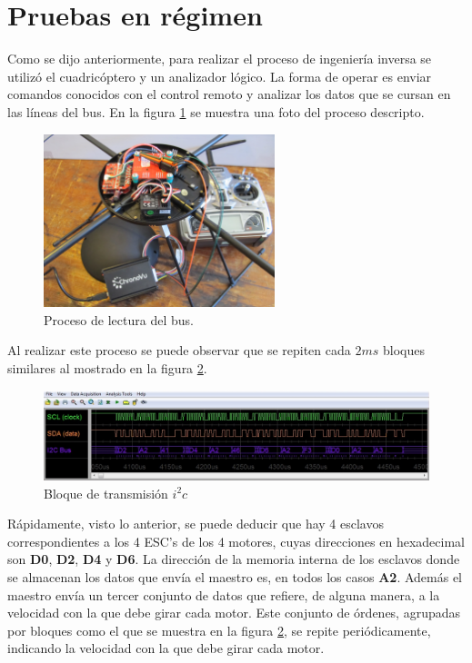 \documentclass[spanish,12pt,a4paper,titlepage]{report}
\begin{document}
\newpage
\section{Pruebas en régimen}

Como se dijo anteriormente, para realizar el proceso de ingeniería inversa se utilizó el cuadricóptero y un analizador lógico. La forma de operar es enviar comandos conocidos con el control remoto y analizar los datos que se cursan en las líneas del bus. En la figura \ref{fig:sniffing} se muestra una foto del proceso descripto.

\begin{figure}[h!]
	\centering
	\includegraphics[width=0.6\textwidth]{./pics/sniffing.jpg}
	\caption{Proceso de lectura del bus.}
	\label{fig:sniffing}
\end{figure}

Al realizar este proceso se puede observar que se repiten cada $2ms$ bloques similares al mostrado en la figura \ref{fig:bloque_snif}.

\begin{figure}[h!]
	\centering
	\includegraphics[width=1\textwidth]{./pics/bloque_snif.jpg}
	\caption{Bloque de transmisión $i^2c$}
	\label{fig:bloque_snif}
\end{figure}

Rápidamente, visto lo anterior, se puede deducir que hay 4 esclavos correspondientes a los 4 ESC's de los 4 motores, cuyas direcciones en hexadecimal son \textbf{D0}, \textbf{D2}, \textbf{D4} y \textbf{D6}. La dirección de la memoria interna de los esclavos donde se almacenan los datos que envía el maestro es, en todos los casos \textbf{A2}. Además el maestro envía un tercer conjunto de datos que refiere, de alguna manera, a la velocidad con la que debe girar cada motor.
Este conjunto de órdenes, agrupadas por bloques como el que se muestra en la figura \ref{fig:bloque_snif}, se repite periódicamente, indicando la velocidad con la que debe girar cada motor.\\
\end{document}
